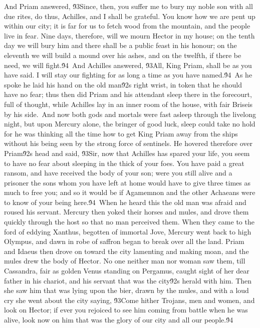 {And Priam answered, \'93Since, then, you suffer me to bury my noble son with all due rites, do thus, Achilles, and I shall be grateful. You know how we are pent up within our city; it is far for us to fetch wood from the mountain, and the people live in fear. Nine days, therefore, will we mourn Hector in my house; on the tenth day we will bury him and there shall be a public feast in his honour; on the eleventh we will build a mound over his ashes, and on the twelfth, if there be need, we will fight.\'94\
And Achilles answered, \'93All, King Priam, shall be as you have said. I will stay our fighting for as long a time as you have named.\'94\
As he spoke he laid his hand on the old man\'92s right wrist, in token that he should have no fear; thus then did Priam and his attendant sleep there in the forecourt, full of thought, while Achilles lay in an inner room of the house, with fair Briseis by his side.\
And now both gods and mortals were fast asleep through the livelong night, but upon Mercury alone, the bringer of good luck, sleep could take no hold for he was thinking all the time how to get King Priam away from the ships without his being seen by the strong force of sentinels. He hovered therefore over Priam\'92s head and said, \'93Sir, now that Achilles has spared your life, you seem to have no fear about sleeping in the thick of your foes. You have paid a great ransom, and have received the body of your son; were you still alive and a prisoner the sons whom you have left at home would have to give three times as much to free you; and so it would be if Agamemnon and the other Achaeans were to know of your being here.\'94\
When he heard this the old man was afraid and roused his servant. Mercury then yoked their horses and mules, and drove them quickly through the host so that no man perceived them. When they came to the ford of eddying Xanthus, begotten of immortal Jove, Mercury went back to high Olympus, and dawn in robe of saffron began to break over all the land. Priam and Idaeus then drove on toward the city lamenting and making moan, and the mules drew the body of Hector. No one neither man nor woman saw them, till Cassandra, fair as golden Venus standing on Pergamus, caught sight of her dear father in his chariot, and his servant that was the city\'92s herald with him. Then she saw him that was lying upon the bier, drawn by the mules, and with a loud cry she went about the city saying, \'93Come hither Trojans, men and women, and look on Hector; if ever you rejoiced to see him coming from battle when he was alive, look now on him that was the glory of our city and all our people.\'94\
}
